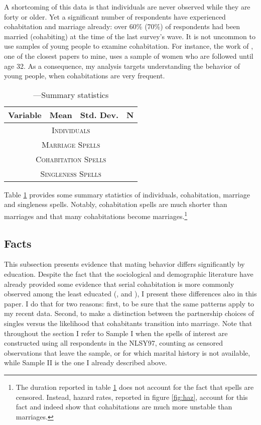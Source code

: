 \documentclass[12pt]{article}
\begin{document}
   A shortcoming of this data is that individuals are never observed while they are forty or older. Yet a significant number of respondents have experienced cohabitation and marriage already: over 60\% (70\%) of respondents had been married (cohabiting) at the time of the last survey's wave. It is not uncommon to use samples of young people to examine cohabitation. For instance, the work of \cite{brien2006}, one of the closest papers to mine, uses a sample of women who are followed until age 32. As a consequence, my analysis targets understanding the behavior of young people, when cohabitations are very frequent.   
      \begin{table}[h!]\centering \caption{---Summary statistics}\label{table:stat}
   	{\begin{tabular}{l c c c}\hline\hline
   			\multicolumn{1}{l}{\textbf{Variable}} & \textbf{Mean} & \textbf{Std. Dev.} & \textbf{N}\\ \hline\hline
   			\multicolumn{4}{c}{\textsc{Individuals}}\\
   			\hline
   			
   			\hline
   			\multicolumn{4}{c}{\textsc{Marriage Spells}}\\
   			\hline
   			
   			\hline
   			\multicolumn{4}{c}{\textsc{Cohabitation Spells}}\\
   			\hline
   			
   			\hline
   			\multicolumn{4}{c}{\textsc{Singleness Spells}}\\
   			\hline
   			
   			\hline
   	\end{tabular}}
   \end{table} 
  Table \ref{table:stat} provides some summary statistics of individuals, cohabitation, marriage and singleness spells. Notably,  cohabitation spells are much shorter than marriages and that many cohabitations become marriages.\footnote{The duration reported in table \ref{table:stat} does not account for the fact that spells are censored. Instead, hazard rates, reported in figure \ref{fig:haz}, account for this fact and indeed show that cohabitations are much more unstable than marriages.}

\subsection{Facts}\label{subsection:facts}
This subsection presents evidence that mating behavior differs significantly by education. Despite the fact that the sociological and demographic literature have already provided some evidence that serial cohabitation is more commonly observed among the least educated (\cite{bumpass2000}, \cite{lichter2010} and \cite{perelli2016}), I present these differences also in this paper. I do that for two reasons: first, to be sure that the same patterns apply to my recent data. Second, to make a distinction between the partnership choices of singles versus the likelihood that cohabitants transition into marriage. Note that throughout the section I refer to Sample I when the spells of interest are constructed using all respondents in the NLSY97, counting as censored observations that leave the sample, or for which marital history is not available, while Sample II is the one I already described above.
\end{document}
